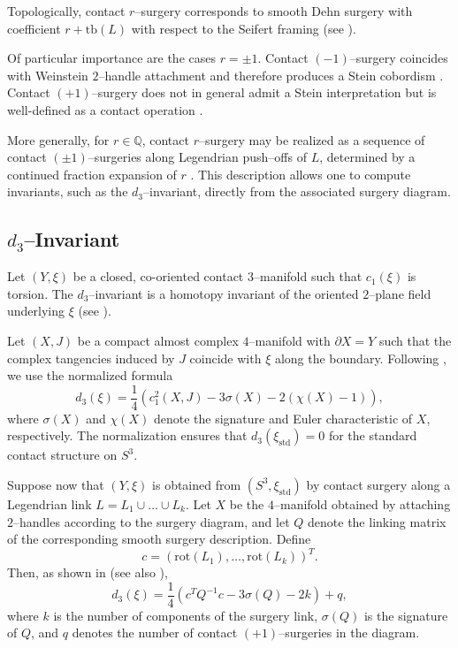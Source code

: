 \documentclass[12pt]{amsart}
\theoremstyle{definition}
\theoremstyle{definition}
\newcommand{\tb}{\text{tb}}
\begin{document}
Topologically, contact $r$–surgery corresponds to smooth
Dehn surgery with coefficient
$r+\tb(L)$
with respect to the Seifert framing
(see \cite{DingGeiges04}).

Of particular importance are the cases $r=\pm1$.
Contact $(-1)$–surgery coincides with Weinstein
$2$–handle attachment and therefore produces a Stein
cobordism \cite{Gompf98}.
Contact $(+1)$–surgery does not in general admit a Stein
interpretation but is well-defined as a contact operation
\cite{DingGeiges04}.

More generally, for $r\in\mathbb{Q}$,
contact $r$–surgery may be realized as a sequence of
contact $(\pm1)$–surgeries along Legendrian push–offs of $L$,
determined by a continued fraction expansion of $r$
\cite{DingGeiges04}.
This description allows one to compute invariants,
such as the $d_3$–invariant, directly from the
associated surgery diagram.
\subsection{$d_3$–Invariant}

Let $(Y,\xi)$ be a closed, co-oriented contact $3$–manifold
such that $c_1(\xi)$ is torsion. The $d_3$–invariant is a
homotopy invariant of the oriented $2$–plane field underlying $\xi$
(see \cite{Gompf98}).

Let $(X,J)$ be a compact almost complex $4$–manifold with
$\partial X = Y$ such that the complex tangencies induced by $J$
coincide with $\xi$ along the boundary. Following
\cite{Gompf98}, we use the normalized formula
\[
d_3(\xi)
=
\frac{1}{4}
\left(
c_1^2(X,J)
-
3\sigma(X)
-
2(\chi(X)-1)
\right),
\]
where $\sigma(X)$ and $\chi(X)$ denote the signature and Euler
characteristic of $X$, respectively.
The normalization ensures that
$d_3(\xi_{\mathrm{std}})=0$ for the standard contact structure
on $S^3$.

Suppose now that $(Y,\xi)$ is obtained from
$(S^3,\xi_{\mathrm{std}})$ by contact surgery along a Legendrian
link $L=L_1\cup \dots \cup L_k$.
Let $X$ be the $4$–manifold obtained by attaching $2$–handles
according to the surgery diagram, and let $Q$ denote the linking
matrix of the corresponding smooth surgery description.
Define
\[
c = (\mathrm{rot}(L_1),\dots,\mathrm{rot}(L_k))^T.
\]
Then, as shown in \cite{Gompf98} (see also \cite{DG}),
\[
d_3(\xi)
=
\frac{1}{4}
\left(
c^T Q^{-1} c
-
3\sigma(Q)
-
2k
\right)
+
q,
\]
where $k$ is the number of components of the surgery link,
$\sigma(Q)$ is the signature of $Q$, and
$q$ denotes the number of contact $(+1)$–surgeries
in the diagram.
\end{document}
